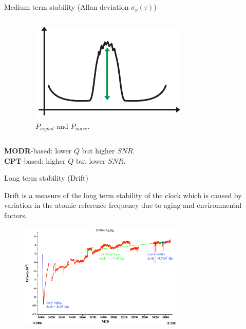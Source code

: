 \begin{frame}{Medium term stability (Allan deviation $\sigma_y(\tau)$)}
\begin{columns}[c, onlytextwidth]
\begin{column}{0.5\textwidth}
        \end{column}

        \begin{column}{0.5\textwidth}

            \begin{figure}
                \centering
                \includegraphics[width=0.7\textwidth]{pdf/P-signal.pdf}
                \caption{$P_{signal}$ and $P_{noise}$.}
            \end{figure}

        \end{column}

    \end{columns}

    \textbf{MODR}-based: lower $Q$ but higher $SNR$.\\
    \textbf{CPT}-based: higher $Q$ but lower $SNR$.

\end{frame}



\begin{frame}{Long term stability (Drift)}

    Drift is a measure of the long term stability of the clock which is caused by variation in the atomic reference frequency due to aging and environmental factors.

    \begin{figure}
        \centering
        \includegraphics[width=0.7\textwidth]{img/drift.png}
    \end{figure}



\end{frame}



